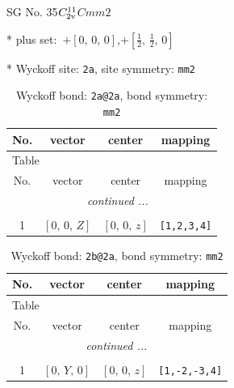 \documentclass[fleqn,8pt]{jsarticle}
\begin{document}
\setcounter{MaxMatrixCols}{32}

\renewcommand{\tablename}{Table~}
\renewcommand{\figurename}{Figure~}
\begin{center}
\LARGE
SG No. 35\quad$C_{\rm 2v}^{11}$\quad$Cmm2$\quad[ orthorhombic ]
\end{center}

* plus set:\,\,\,$+\left[ 0,\, 0,\, 0 \right]$,\quad $+\left[ \frac{1}{2},\, \frac{1}{2},\, 0 \right]$


* Wyckoff site: {\tt 2a}, site symmetry: {\tt mm2}
\renewcommand{\arraystretch}{1.2}
\begin{longtable}{cccc}
\caption{Wyckoff bond: {\tt 2a@2a}, bond symmetry: {\tt mm2}}
 \\
 \hline \hline
No. & vector & center & mapping \\ \hline \endfirsthead

\multicolumn{3}{l}{\tablename\ \thetable{}} \\
 \hline \hline
No. & vector & center & mapping \\ \hline \endhead

 \hline \hline
\multicolumn{3}{r}{\footnotesize\it continued ...} \\ \endfoot

 \hline \hline
\multicolumn{3}{r}{} \\ \endlastfoot

1 & $\left[ 0,\, 0,\, Z \right]$ & $\left[ 0,\, 0,\, z \right]$ & {\tt [1,2,3,4]} \\
\end{longtable}
\renewcommand{\arraystretch}{1.2}
\begin{longtable}{cccc}
\caption{Wyckoff bond: {\tt 2b@2a}, bond symmetry: {\tt mm2}}
 \\
 \hline \hline
No. & vector & center & mapping \\ \hline \endfirsthead

\multicolumn{3}{l}{\tablename\ \thetable{}} \\
 \hline \hline
No. & vector & center & mapping \\ \hline \endhead

 \hline \hline
\multicolumn{3}{r}{\footnotesize\it continued ...} \\ \endfoot

 \hline \hline
\multicolumn{3}{r}{} \\ \endlastfoot

1 & $\left[ 0,\, Y,\, 0 \right]$ & $\left[ 0,\, 0,\, z \right]$ & {\tt [1,-2,-3,4]} \\
\end{longtable}
\end{document}
